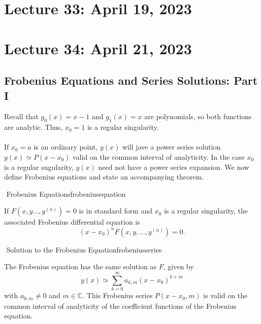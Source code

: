 \section{Lecture 33: April 19, 2023}

\pagebreak

\section{Lecture 34: April 21, 2023}

    \subsection{Frobenius Equations and Series Solutions: Part I}

    Recall that \(g_0(x)=x-1\) and \(g_1(x)=x\) are polynomials, so both functions are analytic. Thus, \(x_0=1\) is a regular singularity.
    \\
    \\
    If \(x_0=a\) is an ordinary point, \(y(x)\) will jave a power series solution \(y(x)\simeq P(x-x_0)\) valid on the common interval of analyticity. In the case \(x_0\) is a regular sngularity, \(y(x)\) need not have a power series expansion. We now define Frobenius equations and state an accompanying theorem.
    \begin{definition}{\Stop\,\,Frobenius Equations}{frobeniusequation}

        If \(F(x,y\ldots,y^{(n)})=0\) is in standard form and \(x_0\) is a regular singularity, the associated Frobenius differential equation is
        \begin{equation*}
            (x-x_0)^nF(x,y,\ldots,y^{(n)})=0.
        \end{equation*}
        
    \end{definition}
    \begin{theorem}{\Stop\,\,Solution to the Frobenius Equation}{frobeniusseries}

        The Frobenius equation has the same solution as \(F\), given by 
        \begin{equation*}
            y(x)\simeq \sum_{k=0}^\infty a_{k,m}(x-x_0)^{k+m}
        \end{equation*}
        with \(a_{0,m}\neq0\) and \(m\in\mathbb{C}\). This Frobenius series \(P(x-x_0,m)\) is valid on the common interval of analyticity of the coefficient functions of the Frobenius equation.
        
    \end{theorem}
